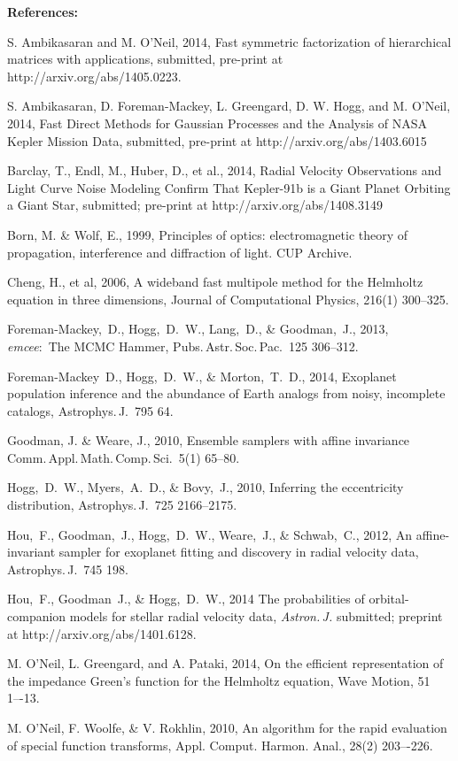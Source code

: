 \documentclass[11pt]{article}
\renewcommand{\paragraph}[1]{\smallskip\par\noindent\textbf{{#1}:}}
\begin{document}
\paragraph{References}
\begin{trivlist}\footnotesize
\item
S. Ambikasaran and M. O'Neil, 2014,
Fast symmetric factorization of hierarchical matrices with applications,
submitted, pre-print at http://arxiv.org/abs/1405.0223.
\item
S. Ambikasaran, D. Foreman-Mackey, L. Greengard, D. W. Hogg, and M. O'Neil, 2014,
Fast Direct Methods for Gaussian Processes and the Analysis of NASA Kepler Mission Data,
submitted, pre-print at http://arxiv.org/abs/1403.6015
\item
Barclay, T., Endl, M., Huber, D., et al., 2014,
Radial Velocity Observations and Light Curve Noise Modeling Confirm That Kepler-91b is a Giant Planet Orbiting a Giant Star,
submitted; pre-print at http://arxiv.org/abs/1408.3149
\item
Born, M. \& Wolf, E., 1999,
Principles of optics: electromagnetic theory of propagation, interference and diffraction of light.
CUP Archive.
\item
Cheng, H., et al, 2006,
A wideband fast multipole method for the Helmholtz equation in three dimensions,
Journal of Computational Physics, 216(1) 300--325.
\item
Foreman-Mackey,~D., Hogg,~D.~W., Lang,~D., \& Goodman,~J., 2013,
\textsl{emcee}:\ The MCMC Hammer,
{Pubs.\,Astr.\,Soc.\,Pac.}\ {125} 306--312.
\item
Foreman-Mackey~D., Hogg,~D.~W., \& Morton,~T.~D., 2014,
{Exoplanet population inference and the abundance of Earth analogs from noisy, incomplete catalogs},
{Astrophys.\,J.}\ {795} 64.
\item
Goodman, J. \& Weare, J., 2010,
Ensemble samplers with affine invariance
Comm.\,Appl.\,Math.\,Comp.\,Sci.\ 5(1) 65--80.
\item
Hogg,~D.~W., Myers,~A.~D., \& Bovy,~J., 2010,
{Inferring the eccentricity distribution},
{Astrophys.\,J.}\ {725} 2166--2175.
\item
Hou,~F., Goodman,~J., Hogg,~D.~W., Weare,~J., \& Schwab,~C., 2012,
{An affine-invariant sampler for exoplanet fitting and discovery in radial velocity data},
{Astrophys.\,J.}\ {745} 198.
\item
Hou,~F., Goodman~J., \& Hogg,~D.~W., 2014
{The probabilities of orbital-companion models for stellar radial velocity data},
\textit{Astron.\,J.} submitted; preprint at http://arxiv.org/abs/1401.6128.
\item
M. O'Neil, L. Greengard, and A. Pataki, 2014, On the efficient representation of the impedance Green’s function for the Helmholtz equation, Wave Motion, 51 1–-13. 
\item
M. O'Neil, F. Woolfe, \& V. Rokhlin, 2010,
An algorithm for the rapid evaluation of special function transforms,
Appl. Comput. Harmon. Anal., 28(2) 203–-226. 
\end{trivlist}
\end{document}
